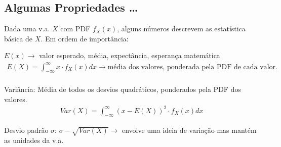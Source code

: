 \documentclass{article}
\begin{document}
\subsection{Algumas Propriedades \ldots}
Dada uma v.a. $X$ com PDF $f_X(x)$, alguns números descrevem as estatística básica de $X$. Em ordem
de importância:

$E(x) \rightarrow$ valor esperado, média, expectância, esperança matemática
\begin{align*}
    E(X) = \int^\infty_{-\infty} x \cdot f_X(x)dx \rightarrow \text{média dos valores, ponderada pela PDF de cada valor.}
\end{align*}
\\[-0.25em]
Variância: Média de todos os desvios quadráticos, ponderados pela PDF dos valores.
\begin{align*}
    Var(X) = \int^\infty_{-\infty} (x - E(X))^2 \cdot f_X(x)dx
\end{align*}

Desvio padrão $\sigma$: $\sigma - \sqrt{Var(X)} \rightarrow$ envolve uma ideia de variação mas
mantém as unidades da v.a.
\end{document}
